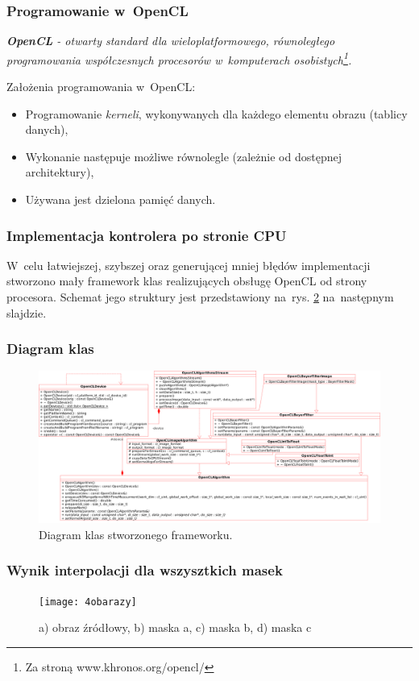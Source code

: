 \documentclass{beamer}
\begin{document}
\begin{frame}
	\frametitle{Programowanie w~OpenCL}
	
	\emph{\textbf{OpenCL} - otwarty standard dla wieloplatformowego, równoległego programowania współczesnych procesorów w~komputerach osobistych\footnote{Za stroną www.khronos.org/opencl/}.}
	
	\vspace{1em}
	
	Założenia programowania w~OpenCL:
	
	\begin{itemize}
	\item Programowanie \emph{kerneli}, wykonywanych dla każdego elementu obrazu (tablicy danych),
	\item Wykonanie następuje możliwe równolegle (zależnie od dostępnej architektury),
	\item Używana jest dzielona pamięć danych.
  \end{itemize}
\end{frame}

\begin{frame}
  \frametitle{Implementacja kontrolera po stronie CPU}
  W~celu łatwiejszej, szybszej oraz generującej mniej błędów implementacji stworzono mały framework klas realizujących obsługę OpenCL od strony procesora.
Schemat jego struktury jest przedstawiony na~rys. \ref{fig:class_diagram} na~następnym slajdzie.
\end{frame}

\begin{frame}
  \frametitle{Diagram klas}
\begin{figure}
  \centering
  \includegraphics[width=0.9\linewidth]{class_diagram}
  \caption{Diagram klas stworzonego frameworku.}
  \label{fig:class_diagram}
\end{figure}
  
\end{frame}

\begin{frame}
  \frametitle{Wynik interpolacji dla wszysztkich masek}

\begin{figure}
  \centering
  \texttt{[image: 4obarazy]}
  \caption{a) obraz źródłowy, b) maska a, c) maska b, d) maska c}
  \label{fig:class_diagram}
\end{figure}

\end{frame}
\end{document}
